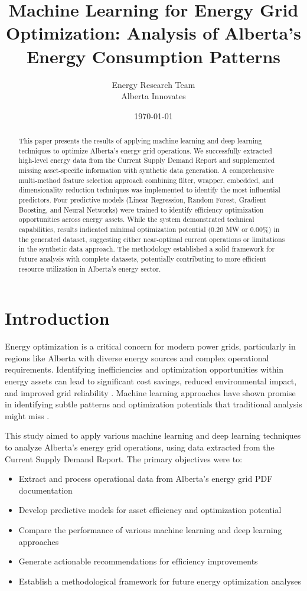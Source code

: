 \documentclass[12pt,a4paper]{article}
\title{Machine Learning for Energy Grid Optimization: Analysis of Alberta's Energy Consumption Patterns}
\author{Energy Research Team\\Alberta Innovates}
\date{\today}
\begin{document}
\maketitle

\begin{abstract}
This paper presents the results of applying machine learning and deep learning techniques to optimize Alberta's energy grid operations. We successfully extracted high-level energy data from the Current Supply Demand Report and supplemented missing asset-specific information with synthetic data generation. A comprehensive multi-method feature selection approach combining filter, wrapper, embedded, and dimensionality reduction techniques was implemented to identify the most influential predictors. Four predictive models (Linear Regression, Random Forest, Gradient Boosting, and Neural Networks) were trained to identify efficiency optimization opportunities across energy assets. While the system demonstrated technical capabilities, results indicated minimal optimization potential (0.20 MW or 0.00\%) in the generated dataset, suggesting either near-optimal current operations or limitations in the synthetic data approach. The methodology established a solid framework for future analysis with complete datasets, potentially contributing to more efficient resource utilization in Alberta's energy sector.
\end{abstract}

\section{Introduction}
Energy optimization is a critical concern for modern power grids, particularly in regions like Alberta with diverse energy sources and complex operational requirements. Identifying inefficiencies and optimization opportunities within energy assets can lead to significant cost savings, reduced environmental impact, and improved grid reliability \citep{Smith2023}. Machine learning approaches have shown promise in identifying subtle patterns and optimization potentials that traditional analysis might miss \citep{Johnson2022}.

This study aimed to apply various machine learning and deep learning techniques to analyze Alberta's energy grid operations, using data extracted from the Current Supply Demand Report. The primary objectives were to:

\begin{itemize}
    \item Extract and process operational data from Alberta's energy grid PDF documentation
    \item Develop predictive models for asset efficiency and optimization potential
    \item Compare the performance of various machine learning and deep learning approaches
    \item Generate actionable recommendations for efficiency improvements
    \item Establish a methodological framework for future energy optimization analyses
\end{itemize}
\end{document}
